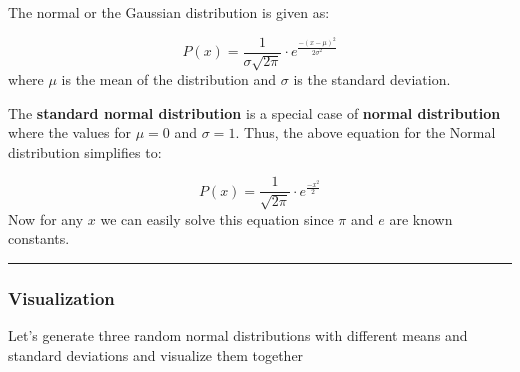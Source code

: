 \documentclass[
]{book}
\begin{document}
The normal or the Gaussian distribution is given as:

\[P(x) = \frac{1}{{\sigma \sqrt {2\pi } }} \cdot e ^ \frac{-(x- \mu)^2}{{2\sigma ^2 }} \] where \(\mu\) is the mean of the distribution and \(\sigma\) is the standard deviation.

The \textbf{standard normal distribution} is a special case of \textbf{normal distribution} where the values for \(\mu = 0\) and \(\sigma = 1\). Thus, the above equation for the Normal distribution simplifies to:

\[P(x) = \frac{1}{{\sqrt {2\pi } }} \cdot e ^ \frac{-x^2}{2} \] Now for any \(x\) we can easily solve this equation since \(\pi\) and \(e\) are known constants.

\begin{center}\rule{0.5\linewidth}{0.5pt}\end{center}

\hypertarget{visualization}{%
\subsubsection{Visualization}\label{visualization}}

Let's generate three random normal distributions with different means and standard deviations and visualize them together
\end{document}
